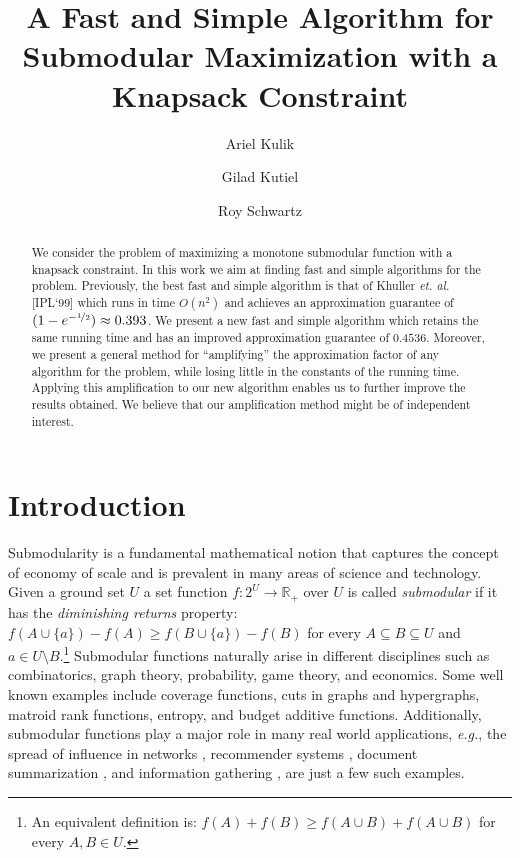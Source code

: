 \documentclass[a4paper,UKenglish,cleveref, autoref]{lipics-v2019}
\title{A Fast and Simple Algorithm for Submodular Maximization with a Knapsack Constraint}
\author{Ariel Kulik}{Department of Computer Science, Technion, Haifa, Israel}{kulik@cs.technion.ac.il}{}{}
\author{Gilad Kutiel}{Department of Computer Science, Technion, Haifa, Israel}{gkutiel@cs.technion.ac.il}{}{}
\author{Roy Schwartz}{Department of Computer Science, Technion, Haifa, Israel}{schwartz@cs.technion.ac.il}{}{}
\begin{document}
\maketitle

\begin{abstract}
We consider the problem of maximizing a monotone submodular function with a knapsack constraint.
In this work we aim at finding fast and simple algorithms for the problem.
Previously, the best fast and simple algorithm is that of Khuller {\em et. al.} [IPL`99] which runs in time $O(n^2)$ and achieves an approximation guarantee of $(1-e^{-\nicefrac[]{1}{2}})\approx 0.393 $.
We present a new fast and simple algorithm which retains the same running time and has an improved approximation guarantee of $0.4536$.
Moreover, we present a general method for ``amplifying'' the approximation factor of any algorithm for the problem, while losing little in the constants of the running time.
Applying this amplification to our new algorithm enables us to further improve the results obtained.
We believe that our amplification method might be of independent interest.

\end{abstract}

\section{Introduction}
Submodularity is a fundamental mathematical notion that captures the concept of economy of scale and is prevalent in many areas of science and technology.
Given a ground set $U$ a set function $f:2^U \to \mathbb{R}_+$ over $U$ is called \emph{submodular} if it has the \emph{diminishing returns} property:
$f(A \cup \{a\}) - f(A) \geq f(B \cup \{a\}) - f(B)$ for every $A \subseteq B \subseteq U$ and $a \in U \setminus B$.\footnote{
    An equivalent definition is: $f(A) + f(B) \geq f(A \cup B) + f(A \cup B)$ for every $A,B \in U$.
}
Submodular functions naturally arise in different disciplines such as combinatorics, graph theory, probability, game theory, and economics.
Some well known examples include coverage functions, cuts in graphs and hypergraphs, matroid rank functions, entropy, and budget additive functions.
Additionally, submodular functions play a major role in many real world applications, {\em e.g.}, the spread of influence in networks \cite{KKT03,KKT05,KKT15,MR10}, recommender systems \cite{EG11,EVSG09}, document summarization \cite{DKR13,LB10,LB11}, and information gathering \cite{GKS05,KG11,KGGK06,KGGK11,KSG08}, are just a few such examples.
\end{document}
